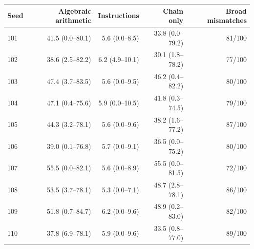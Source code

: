 \begin{tabular}{@{}lrrrr@{}}
\toprule
Seed & Algebraic arithmetic & Instructions & Chain only & Broad mismatches \\
\midrule
101 & 41.5 (0.0--80.1) & 5.6 (0.0--8.5) & 33.8 (0.0--79.2) & 81/100 \\
102 & 38.6 (2.5--82.2) & 6.2 (4.9--10.1) & 30.1 (1.8--78.2) & 77/100 \\
103 & 47.4 (3.7--83.5) & 5.6 (0.0--9.5) & 46.2 (0.4--82.2) & 80/100 \\
104 & 47.1 (0.4--75.6) & 5.9 (0.0--10.5) & 41.8 (0.3--74.5) & 79/100 \\
105 & 44.3 (3.2--78.1) & 5.6 (0.0--9.6) & 38.2 (1.6--77.2) & 87/100 \\
106 & 39.0 (0.1--76.8) & 5.7 (0.0--9.1) & 36.5 (0.0--75.2) & 80/100 \\
107 & 55.5 (0.0--82.1) & 5.6 (0.0--8.9) & 55.5 (0.0--81.5) & 72/100 \\
108 & 53.5 (3.7--78.1) & 5.3 (0.0--7.1) & 48.7 (2.8--78.1) & 86/100 \\
109 & 51.8 (0.7--84.7) & 6.2 (0.0--9.6) & 48.9 (0.2--83.0) & 82/100 \\
110 & 37.8 (6.9--78.1) & 5.9 (0.0--9.6) & 33.5 (0.8--77.0) & 89/100 \\
\bottomrule
\end{tabular}
